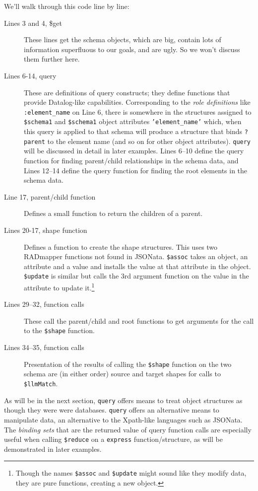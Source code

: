 \documentclass[10pt,letterpaper]{article} %
\newcommand{\stt}[1]{\texttt{#1}} %
\begin{document}
We'll walk through this code line by line:
\begin{description}
\item[Lines 3 and 4, \$get]
  These lines get the schema objects, which are big, contain lots of information superfluous to our goals, and are ugly.
  So we won't discuss them further here.
\item[Lines 6-14, query]
  These are definitions of query constructs;
  they define functions that provide Datalog-like capabilities.
  Corresponding to the \textit{role definitions} like \stt{:element\_name} on Line 6, there is somewhere in the structures assigned to \stt{\$schema1} and \stt{\$schema1}
  object attributes \stt{'element\_name'} which, when this query is applied to that schema will produce a structure that binds \stt{?parent} to the element name (and so on for other object attributes).
  \stt{query} will be discussed in detail in later examples.
  Lines 6--10 define the query function for finding parent/child relationships in the schema data, and
  Lines 12--14 define the query function for finding the root elements in the schema data.
\item[Line 17, parent/child function] Defines a small function to return the children of a parent.
\item[Lines 20-17, shape function] Defines a function to create the shape structures.
  This uses two RADmapper functions not found in JSONata.
  \stt{\$assoc} takes an object, an attribute and a value and installs the value at that attribute in the object.
  \stt{\$update} is similar but calls the 3rd argument function on the value in the attribute to update it.\footnote{
    Though the names  \stt{\$assoc} and  \stt{\$update} might sound like they modify data, they are pure functions, creating a new object.}
\item[Lines 29--32, function calls] These call the parent/child and root functions to get arguments for the call to the \stt{\$shape} function.
\item[Lines 34--35, function calls] Presentation of the results of calling the \stt{\$shape} function on the two schema are (in either order)
  source and target shapes for calls to \stt{\$llmMatch}.
\end{description}

As will be in the next section, \stt{query} offers means to treat object structures as though they were were databases.
\stt{query} offers an alternative means to manipulate data, an alternative to the Xpath-like languages such as JSONata.
The \textit{binding sets} that are the returned value of query function calls are especially useful when calling \stt{\$reduce} on a \stt{express} function/structure, as will be demonstrated in later examples.
\end{document}
